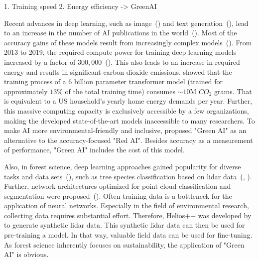\documentclass[12pt, a4paper, hidelinks]{article}
\begin{document}
1. Training speed
2. Energy efficiency -> GreenAI
\fi

Recent advances in deep learning, such as image~(\cite{rombach_2022_high-resolution-image-synthesis-with-latent-diffusion-models}) and text generation~(\cite{openai_2023_gpt4-4-technical-report}), lead to an increase in the number of \ac{AI} publications in the world~(\cite{zhang_2022_ai-report}).
Most of the accuracy gains of these models result from increasingly complex models~(\cite{schwartz_2019_greenai}). From 2013 to 2019, the required compute power for training deep learning models increased by a factor of $300,000$~(\cite{amodei_2018_ai-and-compute}). This also leads to an increase in required energy and results in significant carbon dioxide emissions. \cite{20220610_dodge_measuring-the-carbon-intensity-of-ai-in-cloud-instances} showed that the training process of a 6 billion parameter transformer model (trained for approximately $13$\% of the total training time) consumes $\sim 10$M $CO_2$ grams. That is equivalent to a US household's yearly home energy demands per year. Further, this massive computing capacity is exclusively accessible by a few organizations, making the developed state-of-the-art models inaccessible to many researchers. To make \ac{AI} more environmental-friendly and inclusive, \textcite{schwartz_2019_greenai} proposed "Green AI" as an alternative to the accuracy-focused "Red AI". Besides accuracy as a measurement of performance, "Green AI" includes the cost of this model.

Also, in forest science, deep learning approaches gained popularity for diverse tasks and data sets~(\cite{hamedianfar_2022_deep-learning-for-forest-inventory-and-planning-a-critical-review-on-the-remote-sensing-approaches-so-far-and-prospects-for-further-applications}), such as tree species classification based on \ac{lidar} data~(\cite{liu_2021_tree-species-classification-of-lidar-data-based-on-3D-deep-learning}, \cite{seidel_2021_predicting-tree-species-from-3D-laser-scanning-point-clouds-using-deep-learning}).
Further, network architectures optimized for point cloud classification and segmentation were proposed~(\cite{2017_qi_pointnet}).
Often training data is a bottleneck for the application of neural networks. Especially in the field of environmental research, collecting data requires substantial effort. Therefore, Helios++ was developed by~\textcite{9906068} to generate synthetic \ac{lidar} data. This synthetic \ac{lidar} data can then be used for pre-training a model. In that way, valuable field data can be used for fine-tuning.
As forest science inherently focuses on sustainability, the application of "Green AI" is obvious.
\end{document}
